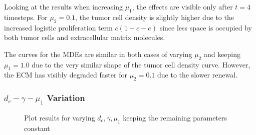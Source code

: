Looking at the results when increasing $\mu_1$, the effects are visible only after $t=4$ timesteps. For $\mu_2=0.1$, the tumor cell density is slightly higher due to the increased logistic proliferation term $c(1-c-e)$ since less space is occupied by both tumor cells and extracellular matrix molecules. 

The curves for the MDEs are similar in both cases of varying $\mu_2$ and keeping $\mu_1=1.0$ due to the very similar shape of the tumor cell density curve. However, the ECM has visibly degraded faster for $\mu_2=0.1$ due to the slower renewal.

\subsubsection*{$d_c - \gamma - \mu_1$ Variation}
\begin{figure}[ht!]
    \centering
    \caption{Plot results for varying $d_c,\gamma,\mu_1$ keeping the remaining parameters constant}
    \label{fig:prolif_dc_gamma_mu_1_variation_1}
\end{figure}

